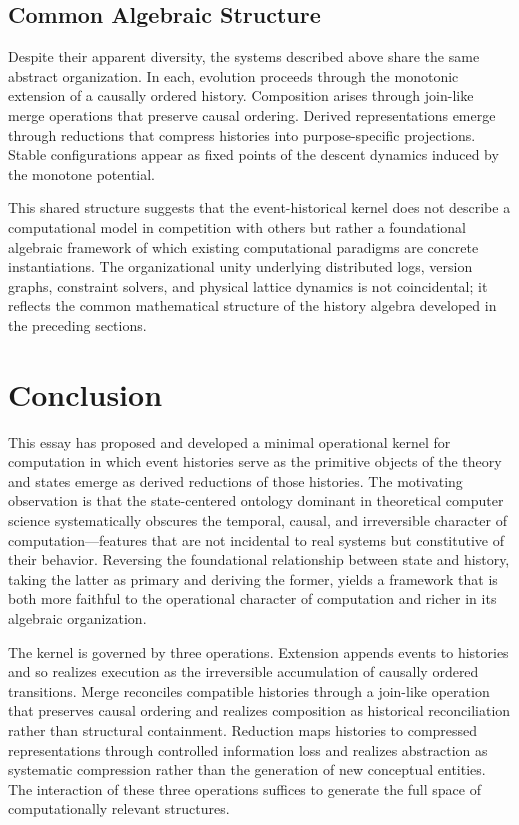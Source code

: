 \documentclass[12pt]{article}
\begin{document}
\subsection{Common Algebraic Structure}

Despite their apparent diversity, the systems described above share the same abstract organization. In each, evolution proceeds through the monotonic extension of a causally ordered history. Composition arises through join-like merge operations that preserve causal ordering. Derived representations emerge through reductions that compress histories into purpose-specific projections. Stable configurations appear as fixed points of the descent dynamics induced by the monotone potential.

This shared structure suggests that the event-historical kernel does not describe a computational model in competition with others but rather a foundational algebraic framework of which existing computational paradigms are concrete instantiations. The organizational unity underlying distributed logs, version graphs, constraint solvers, and physical lattice dynamics is not coincidental; it reflects the common mathematical structure of the history algebra developed in the preceding sections.

\section{Conclusion}
\label{sec:conclusion}

This essay has proposed and developed a minimal operational kernel for computation in which event histories serve as the primitive objects of the theory and states emerge as derived reductions of those histories. The motivating observation is that the state-centered ontology dominant in theoretical computer science systematically obscures the temporal, causal, and irreversible character of computation---features that are not incidental to real systems but constitutive of their behavior. Reversing the foundational relationship between state and history, taking the latter as primary and deriving the former, yields a framework that is both more faithful to the operational character of computation and richer in its algebraic organization.

The kernel is governed by three operations. Extension appends events to histories and so realizes execution as the irreversible accumulation of causally ordered transitions. Merge reconciles compatible histories through a join-like operation that preserves causal ordering and realizes composition as historical reconciliation rather than structural containment. Reduction maps histories to compressed representations through controlled information loss and realizes abstraction as systematic compression rather than the generation of new conceptual entities. The interaction of these three operations suffices to generate the full space of computationally relevant structures.
\end{document}
